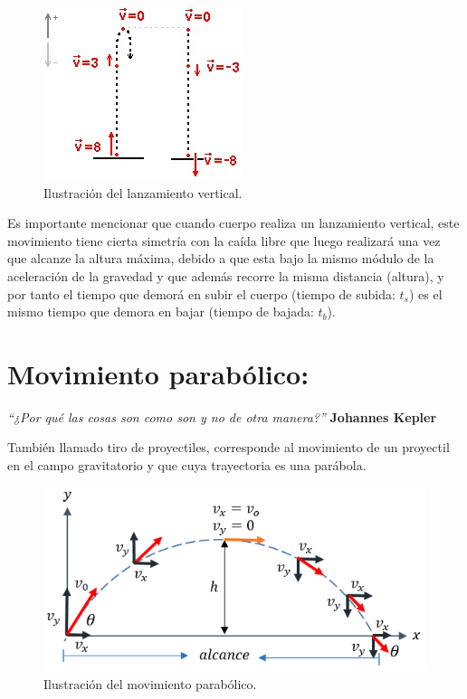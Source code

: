 \documentclass[a5paper,pagesize,10pt,bibtotoc,pointlessnumbers,
normalheadings,DIV=9,fleqn,x11names,table,twoside=false]{scrbook}
\begin{document}
\begin{figure}[ht]
 \centering
 \includegraphics[scale=0.7]{images/lanzamientovertical.jpg}
 \caption{Ilustración del lanzamiento vertical.}\label{lanzamientov}
\end{figure}   
 
Es importante mencionar que cuando cuerpo realiza un lanzamiento vertical, este movimiento tiene cierta simetría con la caída 
libre que luego realizará una vez que alcanze la altura máxima, debido a que esta bajo la mismo módulo de la aceleración de la 
gravedad y que además recorre la misma distancia (altura), y por tanto el tiempo que demorá en subir el cuerpo (tiempo de subida: 
$t_s$) es el mismo tiempo que demora en bajar (tiempo de bajada: $t_b$).

\chapter{Movimiento parabólico:} 
 
\textit{``¿Por qué las cosas son como son y no de otra manera?''} \textbf{Johannes Kepler}
\vspace{1.0cm}  
 
También llamado tiro de proyectiles, corresponde al movimiento de un proyectil en el campo gravitatorio y que cuya  trayectoria es 
una parábola.
 
\begin{figure}[ht]
 \centering
 \includegraphics[scale=0.6]{images/movimiento_parabolico.png}
 \caption{Ilustración del movimiento parabólico.}\label{movparabola}
\end{figure}   
\end{document}
